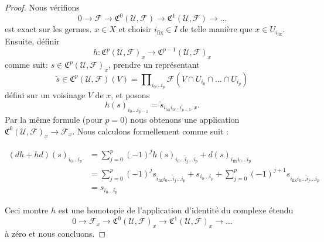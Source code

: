 \begin{proof}

Nous vérifions
$$
0 \to \mathcal{F} \to \mathfrak{C}^0(\mathcal{U}, \mathcal{F}) \to
\mathfrak{C}^1(\mathcal{U}, \mathcal{F}) \to  \ldots
$$
est exact sur les germes. $x \in X$ et choisir $i_{\text{fix}} \in I$
de telle manière que $x \in U_{i_{\text{fix}}}$. Ensuite, définir 
$$
h : \mathfrak{C}^p(\mathcal{U}, \mathcal{F})_x
\to \mathfrak{C}^{p - 1}(\mathcal{U}, \mathcal{F})_x
$$
comme suit: $s \in \mathfrak{C}^p(\mathcal{U}, \mathcal{F})_x$, prendre un représentant
$$
\widetilde{s} \in
\mathfrak{C}^p(\mathcal{U}, \mathcal{F})(V) =
\prod\nolimits_{i_0 \ldots i_p}
\mathcal{F}(V \cap U_{i_0} \cap \ldots \cap U_{i_p})
$$
défini sur un voisinage $V$ de $x$, et posons
$$
h(s)_{i_0 \ldots i_{p - 1}} =
\widetilde{s}_{i_{\text{fix}} i_0 \ldots i_{p - 1}, x}.
$$
Par la même formule (pour $p = 0$) nous obtenons une application
$\mathfrak{C}^{0}(\mathcal{U},\mathcal{F})_x \to \mathcal{F}_x$. Nous calculons formellement comme suit :

\begin{align*}
(dh + hd)(s)_{i_0 \ldots i_p}
& =
\sum\nolimits_{j = 0}^p
(-1)^j
h(s)_{i_0 \ldots \hat i_j \ldots i_p}
+
d(s)_{i_{\text{fix}} i_0 \ldots i_p}\\
& =
\sum\nolimits_{j = 0}^p
(-1)^j
s_{i_{\text{fix}} i_0 \ldots \hat i_j \ldots i_p}
+
s_{i_0 \ldots i_p}
+
\sum\nolimits_{j = 0}^p
(-1)^{j + 1}
s_{i_{\text{fix}} i_0 \ldots \hat i_j \ldots i_p} \\
& =
s_{i_0 \ldots i_p}
\end{align*}

Ceci montre $h$ est une homotopie de l'application d'identité du complexe étendu
$$
0 \to \mathcal{F}_x \to \mathfrak{C}^0(\mathcal{U}, \mathcal{F})_x
\to \mathfrak{C}^1(\mathcal{U}, \mathcal{F})_x \to \ldots
$$
à zéro et nous concluons.

\end{proof}

\noindent

